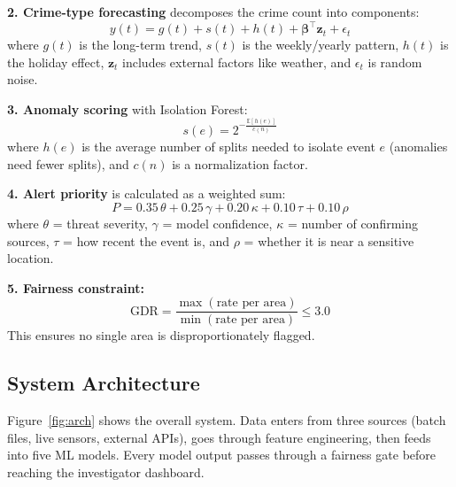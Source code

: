 \documentclass[a4paper,10pt,twocolumn]{article}
\begin{document}
\textbf{2. Crime-type forecasting} decomposes the crime count into components:
\begin{equation}
  y(t) = g(t) + s(t) + h(t) + \boldsymbol{\beta}^\top \mathbf{z}_t + \epsilon_t
  \label{eq:prophet}
\end{equation}
where $g(t)$ is the long-term trend, $s(t)$ is the weekly/yearly pattern, $h(t)$ is the holiday effect, $\mathbf{z}_t$ includes external factors like weather, and $\epsilon_t$ is random noise.

\textbf{3. Anomaly scoring} with Isolation Forest:
\begin{equation}
  s(e) = 2^{-\frac{\mathbb{E}[h(e)]}{c(n)}}
  \label{eq:iforest}
\end{equation}
where $h(e)$ is the average number of splits needed to isolate event $e$ (anomalies need fewer splits), and $c(n)$ is a normalization factor.

\textbf{4. Alert priority} is calculated as a weighted sum:
\begin{equation}
  P = 0.35\,\theta + 0.25\,\gamma + 0.20\,\kappa + 0.10\,\tau + 0.10\,\rho
  \label{eq:priority}
\end{equation}
where $\theta$ = threat severity, $\gamma$ = model confidence, $\kappa$ = number of confirming sources, $\tau$ = how recent the event is, and $\rho$ = whether it is near a sensitive location.

\textbf{5. Fairness constraint:}
\begin{equation}
  \text{GDR} = \frac{\max(\text{rate per area})}{\min(\text{rate per area})} \leq 3.0
  \label{eq:gdr}
\end{equation}
This ensures no single area is disproportionately flagged.

\subsection{System Architecture}

Figure~\ref{fig:arch} shows the overall system. Data enters from three sources (batch files, live sensors, external APIs), goes through feature engineering, then feeds into five ML models. Every model output passes through a fairness gate before reaching the investigator dashboard.
\end{document}
